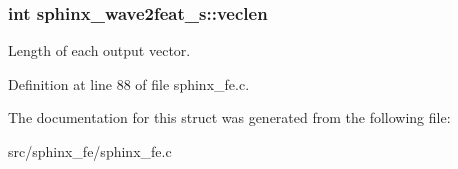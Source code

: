 \subsubsection[{veclen}]{\setlength{\rightskip}{0pt plus 5cm}int sphinx\+\_\+wave2feat\+\_\+s\+::veclen}\label{structsphinx__wave2feat__s_ad71e5fca7c13ae0258bcee81a6f1fa89}


Length of each output vector. 



Definition at line 88 of file sphinx\+\_\+fe.\+c.



The documentation for this struct was generated from the following file\+:\begin{DoxyCompactItemize}
\item 
src/sphinx\+\_\+fe/sphinx\+\_\+fe.\+c\end{DoxyCompactItemize}
